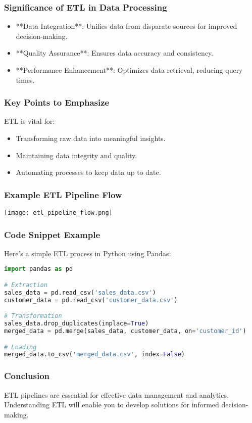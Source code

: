 \documentclass[aspectratio=169]{beamer}
\begin{document}
\begin{frame}[fragile]
    \frametitle{Significance of ETL in Data Processing}
    \begin{itemize}
        \item **Data Integration**: Unifies data from disparate sources for improved decision-making.
        \item **Quality Assurance**: Ensures data accuracy and consistency.
        \item **Performance Enhancement**: Optimizes data retrieval, reducing query times.
    \end{itemize}
\end{frame}

\begin{frame}[fragile]
    \frametitle{Key Points to Emphasize}
    ETL is vital for:
    \begin{itemize}
        \item Transforming raw data into meaningful insights.
        \item Maintaining data integrity and quality.
        \item Automating processes to keep data up to date.
    \end{itemize}
\end{frame}

\begin{frame}[fragile]
    \frametitle{Example ETL Pipeline Flow}
    \begin{center}
        \texttt{[image: etl\_pipeline\_flow.png]}
    \end{center}
\end{frame}

\begin{frame}[fragile]
    \frametitle{Code Snippet Example}
    Here’s a simple ETL process in Python using Pandas:
    \begin{lstlisting}[language=Python]
import pandas as pd

# Extraction
sales_data = pd.read_csv('sales_data.csv')
customer_data = pd.read_csv('customer_data.csv')

# Transformation
sales_data.drop_duplicates(inplace=True)
merged_data = pd.merge(sales_data, customer_data, on='customer_id')

# Loading
merged_data.to_csv('merged_data.csv', index=False)
    \end{lstlisting}
\end{frame}

\begin{frame}[fragile]
    \frametitle{Conclusion}
    ETL pipelines are essential for effective data management and analytics. Understanding ETL will enable you to develop solutions for informed decision-making.
\end{frame}
\end{document}
